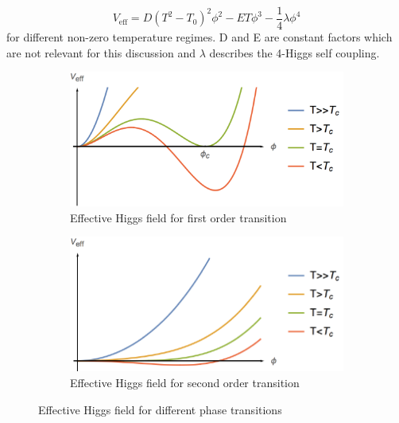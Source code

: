 \begin{equation}
	V_\text{eff}=D(T^2-T_0)^2\phi^2-ET\phi^3-\frac{1}{4}\lambda\phi^4
	\label{effective_pot}
\end{equation}
for different non-zero temperature regimes. D and E are constant factors which are not relevant for this discussion and $\lambda$ describes the 4-Higgs self coupling.
\begin{figure}[H]
	\centering
	\begin{subfigure}{0.7\textwidth}
		\includegraphics[width=\linewidth]{Images/Higgs1}
		\caption{Effective Higgs field for first order transition}
		\label{fig:higgs1}	
	\end{subfigure}
	\begin{subfigure}{0.7\textwidth}
		\includegraphics[width=\linewidth]{Images/Higgs2}
		\caption{Effective Higgs field for second order transition}
		\label{fig:higgs2}
	\end{subfigure}
	\caption{Effective Higgs field for different phase transitions}
	\label{fig:higgs}
\end{figure}
\noindent
